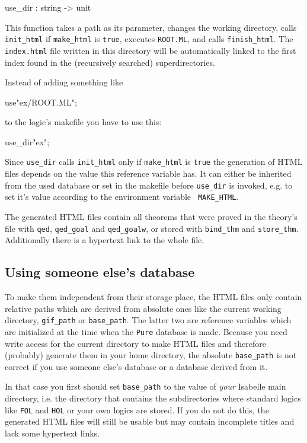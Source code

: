 \begin{ttbox}
use_dir : string -> unit
\end{ttbox}

This function takes a path as its parameter, changes the working
directory, calls {\tt init_html} if {\tt make_html} is {\tt true},
executes {\tt ROOT.ML}, and calls {\tt finish_html}. The {\tt
index.html} file written in this directory will be automatically
linked to the first index found in the (recursively searched)
superdirectories.

Instead of adding something like

\begin{ttbox}
use"ex/ROOT.ML";
\end{ttbox}

to the logic's makefile you have to use this:

\begin{ttbox}
use_dir"ex";
\end{ttbox}

Since {\tt use_dir} calls {\tt init_html} only if {\tt make_html} is
{\tt true} the generation of HTML files depends on the value this
reference variable has. It can either be inherited from the used \ML{}
database or set in the makefile before {\tt use_dir} is invoked,
e.g. to set it's value according to the environment variable {\tt
MAKE_HTML}.

The generated HTML files contain all theorems that were proved in the
theory's \ML{} file with {\tt qed}, {\tt qed_goal} and {\tt qed_goalw},
or stored with {\tt bind_thm} and {\tt store_thm}. Additionally there
is a hypertext link to the whole \ML{} file.


\subsection*{Using someone else's database}

To make them independent from their storage place, the HTML files only
contain relative paths which are derived from absolute ones like the
current working directory, {\tt gif_path} or {\tt base_path}. The
latter two are reference variables which are initialized at the time
when the {\tt Pure} database is made. Because you need write access
for the current directory to make HTML files and therefore (probably)
generate them in your home directory, the absolute {\tt base_path} is
not correct if you use someone else's database or a database derived
from it.

In that case you first should set {\tt base_path} to the value of {\em
your} Isabelle main directory, i.e. the directory that contains the
subdirectories where standard logics like {\tt FOL} and {\tt HOL} or
your own logics are stored. If you do not do this, the generated HTML
files will still be usable but may contain incomplete titles and lack
some hypertext links.

